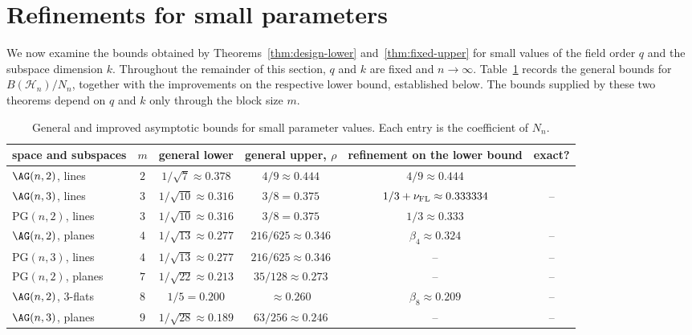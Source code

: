 \documentclass[10pt]{article}
\newcommand{\PG}{\mathrm{PG}}
\theoremstyle{definition}
\begin{document}
	
	\section[Refinements for small parameters $m$]{{Refinements} for small parameters}
	\label{sec:ref}
	We now examine the bounds obtained by Theorems~\ref{thm:design-lower} and~\ref{thm:fixed-upper}
	for small values of the field order \(q\) and the subspace dimension
	\(k\). Throughout the remainder of this section, \(q\) and \(k\) are
	fixed and \(n\to\infty\). Table~\ref{tab:small-parameters} records the
	general bounds for \(B(\mathcal H_n)/N_n\), together with the improvements on the respective lower bound, established
	below. The bounds supplied by these two theorems depend
	on \(q\) and \(k\) only through the block size \(m\).
	
	\begin{table}[ht]
		\centering
		\small
		\setlength{\tabcolsep}{9pt}
		\begin{tabular}{lccccc}
			\hline
			space and subspaces & \(m\) & general lower & general upper, $\rho$ & refinement on the lower bound  & exact?\\
			\hline
			\(\AG(n,2)\), lines
			& \(2\)
			& \(1/\sqrt7\approx0.378\)
			& \(4/9\approx0.444\)
			&  \(4/9\approx0.444\)& \checkmark \\
			
			\(\AG(n,3)\), lines
			& \(3\)
			& \(1/\sqrt{10}\approx0.316\)
			& \(3/8=0.375\)
			&  \(1/3+\nu_{\rm FL}\approx0.333334\) & -- \\
			
			\(\PG(n,2)\), lines
			& \(3\)
			& \(1/\sqrt{10}\approx0.316\)
			& \(3/8=0.375\)
			&  \(1/3\approx0.333\) & \checkmark \\
			
			\(\AG(n,2)\), planes
			& \(4\)
			& \(1/\sqrt{13}\approx0.277\)
			& \(216/625\approx0.346\)
			&  \(\beta_4\approx0.324\) & --\\
			
			\(\PG(n,3)\), lines
			& \(4\)
			& \(1/\sqrt{13}\approx0.277\)
			& \(216/625\approx0.346\)
			& -- & --\\
			
			\(\PG(n,2)\), planes
			& \(7\)
			& \(1/\sqrt{22}\approx0.213\)
			& \(35/128\approx0.273\)
			& -- & -- \\
			
			\(\AG(n,2)\), \(3\)-flats
			& \(8\)
			& \(1/5=0.200\)
			& \(\approx0.260\)
			&  \(\beta_8\approx0.209\) & --\\
			
			\(\AG(n,3)\), planes
			& \(9\)
			& \(1/\sqrt{28}\approx0.189\)
			& \(63/256\approx0.246\)
			& -- & -- \\
			\hline
		\end{tabular}
		\caption{General and improved asymptotic bounds for small parameter
			values. Each entry is the coefficient of \(N_n\).}
		\label{tab:small-parameters}
	\end{table}
	
\end{document}
